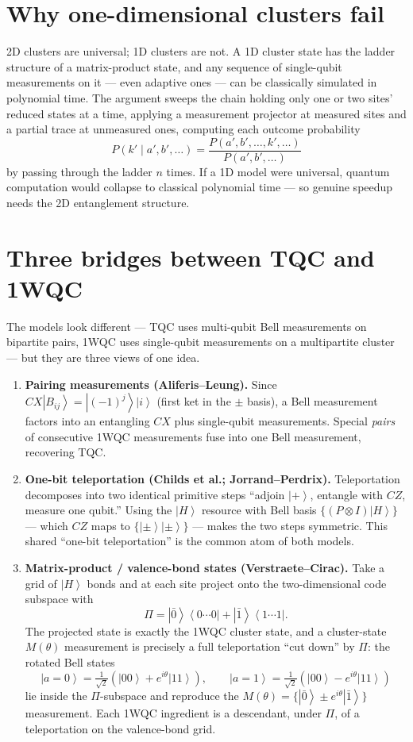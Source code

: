 \documentclass[11pt]{article}
\newcommand{\ket}[1]{\left|#1\right\rangle}
\newcommand{\bra}[1]{\left\langle#1\right|}
\theoremstyle{plain}
\begin{document}
\section{Why one-dimensional clusters fail}
2D clusters are universal; 1D clusters are not. A 1D cluster state has the ladder structure of a
matrix-product state, and any sequence of single-qubit measurements on it --- even adaptive ones ---
can be classically simulated in polynomial time. The argument sweeps the chain holding only one or two
sites' reduced states at a time, applying a measurement projector at measured sites and a partial trace
at unmeasured ones, computing each outcome probability
\[ P(k' \mid a',b',\dots) = \frac{P(a',b',\dots,k',\dots)}{P(a',b',\dots)} \]
by passing through the ladder $n$ times. If a 1D model were universal, quantum computation would
collapse to classical polynomial time --- so genuine speedup needs the 2D entanglement structure.

\section{Three bridges between TQC and 1WQC}
The models look different --- TQC uses multi-qubit Bell measurements on bipartite pairs, 1WQC uses
single-qubit measurements on a multipartite cluster --- but they are three views of one idea.
\begin{enumerate}[leftmargin=*]
  \item \textbf{Pairing measurements (Aliferis--Leung).} Since $CX\ket{B_{ij}} = \ket{(-1)^j}\ket{i}$
  (first ket in the $\pm$ basis), a Bell measurement factors into an entangling $CX$ plus single-qubit
  measurements. Special \emph{pairs} of consecutive 1WQC measurements fuse into one Bell measurement,
  recovering TQC.
  \item \textbf{One-bit teleportation (Childs et al.; Jorrand--Perdrix).} Teleportation decomposes into
  two identical primitive steps ``adjoin $\ket{+}$, entangle with $CZ$, measure one qubit.'' Using the
  $\ket{H}$ resource with Bell basis $\{(P\otimes I)\ket{H}\}$ --- which $CZ$ maps to
  $\{\ket{\pm}\ket{\pm}\}$ --- makes the two steps symmetric. This shared ``one-bit teleportation'' is
  the common atom of both models.
  \item \textbf{Matrix-product / valence-bond states (Verstraete--Cirac).} Take a grid of $\ket{H}$
  bonds and at each site project onto the two-dimensional code subspace with
  \[ \Pi = \ket{\bar 0}\bra{0\cdots 0} + \ket{\bar 1}\bra{1\cdots 1}. \]
  The projected state is exactly the 1WQC cluster state, and a cluster-state $M(\theta)$ measurement
  is precisely a full teleportation ``cut down'' by $\Pi$: the rotated Bell states
  \[ \ket{a{=}0} = \tfrac{1}{\sqrt2}(\ket{00} + e^{i\theta}\ket{11}),\qquad
     \ket{a{=}1} = \tfrac{1}{\sqrt2}(\ket{00} - e^{i\theta}\ket{11}) \]
  lie inside the $\Pi$-subspace and reproduce the $M(\theta)=\{\ket{\bar0}\pm e^{i\theta}\ket{\bar1}\}$
  measurement. Each 1WQC ingredient is a descendant, under $\Pi$, of a teleportation on the
  valence-bond grid.
\end{enumerate}
\end{document}
